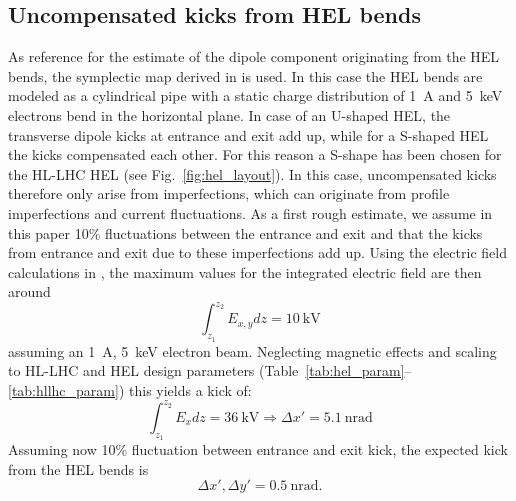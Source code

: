 \documentclass[%
 reprint,
 amsmath,amssymb,
 aps,
prstab,
]{revtex4-1}
\newcommand{\q}[2]{\ensuremath{#1\ \mathrm{#2}}} %
\begin{document}
\subsection{Uncompensated kicks from HEL bends}
\label{core:sec:1}
As reference for the estimate of the dipole component originating from the HEL bends, the symplectic map derived in \cite{hel_bends_stancari} is used. In this case the HEL bends are modeled as a cylindrical pipe with a static charge distribution of 1~A and 5~keV electrons bend in the horizontal plane. In case of an U-shaped HEL, the transverse dipole kicks at entrance and exit add up, while for a S-shaped HEL the kicks compensated each other. For this reason a S-shape has been chosen for the HL-LHC HEL (see Fig.~\ref{fig:hel_layout}). In this case, uncompensated kicks therefore only arise from imperfections, which can originate from profile imperfections and current fluctuations. As a first rough estimate, we assume in this paper 10\% fluctuations between the entrance and exit and that the kicks from entrance and exit due to these imperfections add up. Using the electric field calculations in \cite{hel_bends_stancari}, the maximum values for the integrated electric field are then around
\begin{equation}
\int_{z_1}^{z_2} E_{x,y} dz= 10 \ \mathrm{kV}
\end{equation}
assuming an \SI{1}{A}, \SI{5}{keV} electron beam.
Neglecting magnetic effects and scaling to HL-LHC and HEL design parameters (Table~\ref{tab:hel_param}--\ref{tab:hllhc_param}) this yields a kick of:
\begin{equation}
\int_{z_1}^{z_2} E_{x} dz= 36 \ \mathrm{kV} \Rightarrow \Delta x'= \q{5.1}{nrad}
\end{equation}
Assuming now 10\% fluctuation between entrance and exit kick, the expected kick from the HEL bends is
\begin{equation}\label{eqn:kick_bends}
\Delta x', \Delta y'= \q{0.5}{nrad}.
\end{equation}
\end{document}
